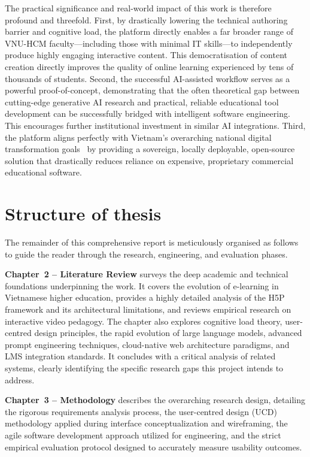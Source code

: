 The practical significance and real-world impact of this work is therefore profound and threefold. First, by drastically lowering the technical authoring barrier and cognitive load, the platform directly enables a far broader range of VNU-HCM faculty—including those with minimal IT skills—to independently produce highly engaging interactive content. This democratisation of content creation directly improves the quality of online learning experienced by tens of thousands of students. Second, the successful AI-assisted workflow serves as a powerful proof-of-concept, demonstrating that the often theoretical gap between cutting-edge generative AI research and practical, reliable educational tool development can be successfully bridged with intelligent software engineering. This encourages further institutional investment in similar AI integrations. Third, the platform aligns perfectly with Vietnam's overarching national digital transformation goals~\cite{vietnam_strategy2021} by providing a sovereign, locally deployable, open-source solution that drastically reduces reliance on expensive, proprietary commercial educational software.

\section{Structure of thesis}

The remainder of this comprehensive report is meticulously organised as follows to guide the reader through the research, engineering, and evaluation phases.

\textbf{Chapter~2 -- Literature Review} surveys the deep academic and technical foundations underpinning the work. It covers the evolution of e-learning in Vietnamese higher education, provides a highly detailed analysis of the H5P framework and its architectural limitations, and reviews empirical research on interactive video pedagogy. The chapter also explores cognitive load theory, user-centred design principles, the rapid evolution of large language models, advanced prompt engineering techniques, cloud-native web architecture paradigms, and LMS integration standards. It concludes with a critical analysis of related systems, clearly identifying the specific research gaps this project intends to address.

\textbf{Chapter~3 -- Methodology} describes the overarching research design, detailing the rigorous requirements analysis process, the user-centred design (UCD) methodology applied during interface conceptualization and wireframing, the agile software development approach utilized for engineering, and the strict empirical evaluation protocol designed to accurately measure usability outcomes.

